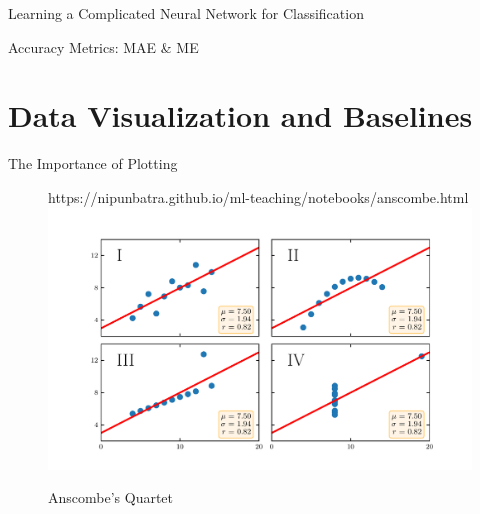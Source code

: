 \documentclass[usenames,dvipsnames]{beamer}
\begin{document}
\begin{frame}{Learning a Complicated Neural Network for Classification}
\begin{frame}{Accuracy Metrics: MAE \& ME}
\end{frame}





\section{Data Visualization and Baselines}

\begin{frame}{The Importance of Plotting}
    \begin{figure}[htp]
      \centering
      \begin{notebookbox}{https://nipunbatra.github.io/ml-teaching/notebooks/anscombe.html}
        \includegraphics[width=\linewidth]{../assets/accuracy-convention/figures/anscombe.pdf}
      \end{notebookbox}
      \caption{Anscombe’s Quartet}
    \end{figure}
  \end{frame}


\end{frame}
\end{document}
